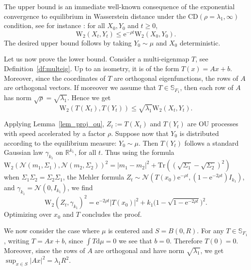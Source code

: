 \documentclass[10pt,reqno]{amsart}
\numberwithin{equation}{section}
\begin{document}
The upper bound is an immediate well-known consequence of the exponential
convergence to equilibrium in Wasserstein distance under the
CD$(\rho=\lambda_1, \infty)$ condition, see for instance \cite{vRS05}: for all
$X_0,Y_0$ and $t\geq0$,
\begin{equation}
  \mathrm{W}_2(X_t, Y_t) 
  \leq \mathrm{e}^{-\rho t}\mathrm{W}_2(X_0, Y_0).
\end{equation}
The desired upper bound follows by taking $Y_0\sim\mu$ and $X_0$
deterministic.

Let us now prove the lower bound. Consider a multi-eigenmap $T$, see
Definition~\ref{df:multeig}. Up to an isometry, it is of the form
$T(x) = Ax + b$. Moreover, since the coordinates of $T$ are orthogonal
eigenfunctions, the rows of $A$ are orthogonal vectors. If moreover we assume
that $T \in \mathbb{S}_{F_1}$, then each row of $A$ has norm
$\sqrt{\rho} = \sqrt{\lambda_1}$. Hence we get
\begin{equation}
  \mathrm{W}_2(T(X_t), T(Y_t)) \leq \sqrt{\lambda_1}\mathrm{W}_2(X_t,Y_t).
\end{equation}

Applying Lemma~\ref{lem_proj_ou}, $Z_t:=T(X_t)$ and $T(Y_t)$ are OU processes
with speed accelerated by a factor $\rho$. Suppose now that $Y_0$ is
distributed according to the equilibrium measure: $Y_0\sim\mu$. Then $T(Y_t)$
follows a standard Gaussian law $\gamma_{k_1}$ on $\mathbb{R}^{k_1}$, for all
$t$. Thus using the formula
$\mathrm{W}_2(\mathcal{N}(m_1,\Sigma_1),\mathcal{N}(m_2,\Sigma_2))^2=|m_1-m_2|^2+\mathrm{Tr}((\sqrt{\Sigma_1}-\sqrt{\Sigma_2})^2)$
when $\Sigma_1\Sigma_2=\Sigma_2\Sigma_1$, the Mehler formula
$Z_t\sim\mathcal{N}(T(x_0)\mathrm{e}^{-\rho t},(1-\mathrm{e}^{-2\rho
  t})I_{k_1})$, and $\gamma_{k_1}=\mathcal{N}(0,I_{k_1})$, we find
\begin{equation}
  \mathrm{W}_2(Z_t, \gamma_{k_1})^2 
  = \mathrm{e}^{-2\rho t}|T(x_0)|^2+k_1\bigl(1-\sqrt{1-\mathrm{e}^{-2\rho
      t}}\bigr)^2.
\end{equation}
Optimizing over $x_0$ and $T$ concludes the proof. 

We now consider the case where $\mu$ is centered and $S = B(0,R)$. For any
$T \in \mathbb{S}_{F_1}$, writing $T = Ax+b$, since $\int T\mathrm{d}\mu = 0$ we see
that $b = 0$. Therefore $T(0) = 0$. Moreover, since the rows of $A$ are
orthogonal and have norm $\sqrt{\lambda_1}$, we get
$\sup_{x\in S}|Ax|^2 = \lambda_1 R^2$.
\end{document}
